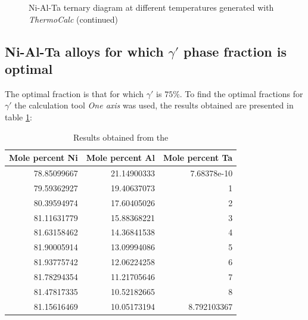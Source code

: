 \begin{figure}[H]
{    }
  \caption[]{\centering Ni-Al-Ta ternary diagram at different temperatures generated with \textit{ThermoCalc} \citep{thermocalc} (continued)}
\end{figure}



\newpage
\subsection{Ni-Al-Ta alloys for which $\gamma'$ phase fraction is optimal}

The optimal fraction is that for which $\gamma'$ is $75\%$. To find the optimal fractions for $\gamma'$ the calculation tool \textit{One axis} was used, the results obtained are presented in table \ref{tab:tab02}:

\begin{table}[h]
  \centering
    \begin{tabular}{rrr}
        \multicolumn{1}{c}{\textbf{Mole percent Ni}} & \multicolumn{1}{c}{\textbf{Mole percent Al}} & \multicolumn{1}{c}{\textbf{Mole percent Ta}} \\ \hline \hline
        78.85099667 & 21.14900333 & 7.68378e-10 \\
        79.59362927 & 19.40637073 & 1 \\
        80.39594974 & 17.60405026 & 2 \\
        81.11631779 & 15.88368221 & 3 \\
        81.63158462 & 14.36841538 & 4 \\
        81.90005914 & 13.09994086 & 5 \\
        81.93775742 & 12.06224258 & 6 \\
        81.78294354 & 11.21705646 & 7 \\
        81.47817335 & 10.52182665 & 8 \\
        81.15616469 & 10.05173194 & 8.792103367
    \end{tabular}
  \caption{Results obtained from the }
  \label{tab:tab02}
\end{table}

